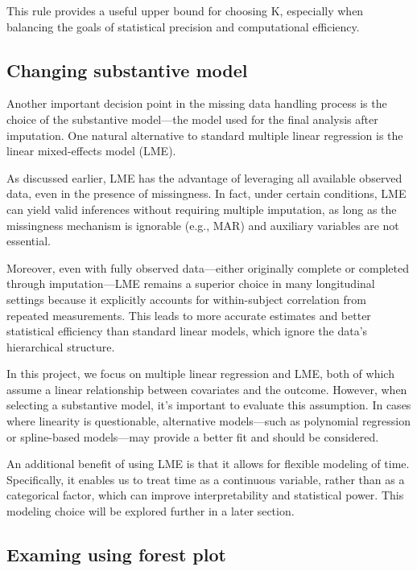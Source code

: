 \documentclass{article}
\begin{document}
This rule provides a useful upper bound for choosing K, especially when
balancing the goals of statistical precision and computational
efficiency.

\subsection{Changing substantive
model}\label{changing-substantive-model}

Another important decision point in the missing data handling process is
the choice of the substantive model---the model used for the final
analysis after imputation. One natural alternative to standard multiple
linear regression is the linear mixed-effects model (LME).

As discussed earlier, LME has the advantage of leveraging all available
observed data, even in the presence of missingness. In fact, under
certain conditions, LME can yield valid inferences without requiring
multiple imputation, as long as the missingness mechanism is ignorable
(e.g., MAR) and auxiliary variables are not essential.

Moreover, even with fully observed data---either originally complete or
completed through imputation---LME remains a superior choice in many
longitudinal settings because it explicitly accounts for within-subject
correlation from repeated measurements. This leads to more accurate
estimates and better statistical efficiency than standard linear models,
which ignore the data's hierarchical structure.

In this project, we focus on multiple linear regression and LME, both of
which assume a linear relationship between covariates and the outcome.
However, when selecting a substantive model, it's important to evaluate
this assumption. In cases where linearity is questionable, alternative
models---such as polynomial regression or spline-based models---may
provide a better fit and should be considered.

An additional benefit of using LME is that it allows for flexible
modeling of time. Specifically, it enables us to treat time as a
continuous variable, rather than as a categorical factor, which can
improve interpretability and statistical power. This modeling choice
will be explored further in a later section.

\subsection{Examing using forest plot}\label{examing-using-forest-plot}
\end{document}
